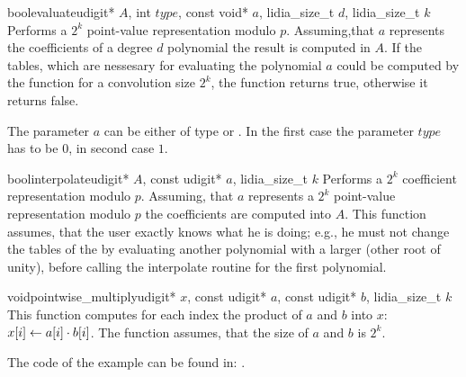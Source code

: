 \begin{Tfcode}{bool}{evaluate}{udigit* $A$, int $\mathit{type}$, const void* $a$,
    lidia_size_t $d$, lidia_size_t $k$}%
  Performs a $2^k$ point-value representation modulo $p$.  Assuming,that $a$ represents the
  coefficients of a degree $d$ polynomial the result is computed in $A$.  If the tables, which
  are nessesary for evaluating the polynomial $a$ could be computed by the function
   for a convolution size $2^k$, the function returns true, otherwise it
  returns false.
  
  The parameter $a$ can be either of type  or .  In the first case
  the parameter $\mathit{type}$ has to be $0$, in second case $1$.
\end{Tfcode}

\begin{Tfcode}{bool}{interpolate}{udigit* $A$, const udigit* $a$, lidia_size_t $k$}
  Performs a $2^k$ coefficient representation modulo $p$.  Assuming, that $a$ represents a $2^k$
  point-value representation modulo $p$ the coefficients are computed into $A$.  This function
  assumes, that the user exactly knows what he is doing; e.g., he must not change the tables of
  the  by evaluating another polynomial with a larger  (other
  root of unity), before calling the interpolate routine for the first polynomial.
\end{Tfcode}

\begin{Tfcode}{void}{pointwise_multiply}{udigit* $x$, const udigit* $a$, const udigit* $b$,
    lidia_size_t $k$}%
  This function computes for each index the product of $a$ and $b$ into $x$: $x[i] \leftarrow a[i]
  \cdot b[i]$.  The function assumes, that the size of $a$ and $b$ is $2^k$.
\end{Tfcode}



\SEEALSO




\EXAMPLES

The code of the example can be found in:
.

